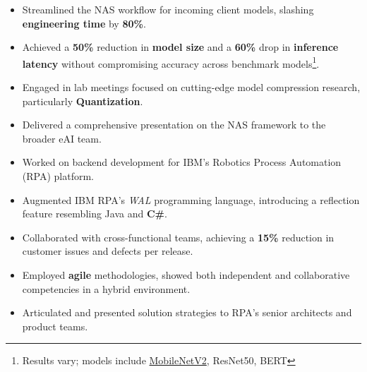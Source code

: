\documentclass[10pt,a4paper,ragged2e,withhyper]{altacv}
\begin{document}
\begin{paracol}{2}
\begin{itemize}
    \item Streamlined the NAS workflow for incoming client models, slashing
        \textbf{engineering time} by \textbf{80\%}.
    
    \item Achieved a \textbf{50\%} reduction in \textbf{model size} and a
        \textbf{60\%} drop in \textbf{inference latency} without compromising accuracy across benchmark models\footnote*{Results vary; models include \href{https://arxiv.org/abs/1801.04381}{MobileNetV2}, ResNet50, BERT}.
    
    \item Engaged in lab meetings focused on cutting-edge model compression
        research, particularly \textbf{Quantization}.
    
    \item Delivered a comprehensive presentation on the NAS framework to the
        broader eAI team.

\end{itemize}

\divider{}


\begin{itemize}

    \item Worked on backend development for IBM's Robotics Process Automation (RPA) platform.
    
    \item Augmented IBM RPA's \textit{WAL} programming
        language, introducing a reflection feature resembling Java and \textbf{C\#}.
    
    \item Collaborated with cross-functional teams, achieving a \textbf{15\%} reduction in customer issues and defects per release.
    
    \item Employed \textbf{agile} methodologies, showed both independent and
        collaborative competencies in a hybrid environment.
    
    \item Articulated and presented solution strategies to RPA's senior architects and product teams. 

    

\end{itemize}
\end{paracol}
\end{document}
